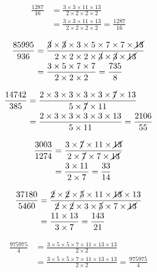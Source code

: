 {{\item\begin{align*}
    \frac{1287}{16} &=
    \frac{3 \times 3 \times 11 \times 13}
    {2 \times 2 \times 2 \times 2}\\ &=
    \frac{3 \times 3 \times 11 \times 13}
    {2 \times 2 \times 2 \times 2} =
    \frac{1287}{16}
    \end{align*}

\item\begin{align*}
    \frac{85995}{936} &=
    \frac{\cancel{3} \times \cancel{3} \times 3 \times 5 \times 7 \times 7 \times \cancel{13}}
    {2 \times 2 \times 2 \times \cancel{3} \times \cancel{3} \times \cancel{13}}\\ &=
    \frac{3 \times 5 \times 7 \times 7}
    {2 \times 2 \times 2} =
    \frac{735}{8}
    \end{align*}

\item\begin{align*}
    \frac{14742}{385} &=
    \frac{2 \times 3 \times 3 \times 3 \times 3 \times \cancel{7} \times 13}
    {5 \times \cancel{7} \times 11}\\ &=
    \frac{2 \times 3 \times 3 \times 3 \times 3 \times 13}
    {5 \times 11} =
    \frac{2106}{55}
    \end{align*}

\item\begin{align*}
    \frac{3003}{1274} &=
    \frac{3 \times \cancel{7} \times 11 \times \cancel{13}}
    {2 \times \cancel{7} \times 7 \times \cancel{13}}\\ &=
    \frac{3 \times 11}
    {2 \times 7} =
    \frac{33}{14}
    \end{align*}

\item\begin{align*}
    \frac{37180}{5460} &=
    \frac{\cancel{2} \times \cancel{2} \times \cancel{5} \times 11 \times \cancel{13} \times 13}
    {\cancel{2} \times \cancel{2} \times 3 \times \cancel{5} \times 7 \times \cancel{13}}\\ &=
    \frac{11 \times 13}
    {3 \times 7} =
    \frac{143}{21}
    \end{align*}

\item\begin{align*}
    \frac{975975}{4} &=
    \frac{3 \times 5 \times 5 \times 7 \times 11 \times 13 \times 13}
    {2 \times 2}\\ &=
    \frac{3 \times 5 \times 5 \times 7 \times 11 \times 13 \times 13}
    {2 \times 2} =
    \frac{975975}{4}
    \end{align*}

}}
